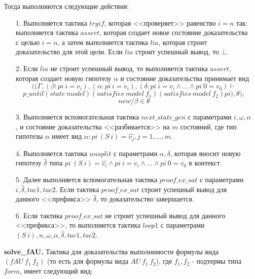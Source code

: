 \documentclass[12pt]{article}
\begin{document}
Тогда выполняются следующие действия:
\begin{enumerate}
    \item[1.] Выполняется тактика $tryif$, которая <<проверяет>> равенство $i=n$ так: выполняется тактика $assert$, которая создает новое состояние доказательства с целью $i=n$, а затем выполняется тактика $lia$, которая строит доказательство для этой цели. Если $lia$ строит успешный вывод, то $\bot$.
    \item[2.] Если $lia$ не строит успешный вывод, то выполняется тактика $assert$, которая создает новую гипотезу $\alpha$ и состояние доказательства принимает вид
    $$((\Gamma, (\beta: pi\ i = v_i),(\alpha: pi\ i = v_i),(\delta: pi\ i = v_{i} \wedge ... \wedge pi\ 0 = v_0) \vdash $$
    $$p\_until (state\ model) (satisfies\ model\ f_1) (satisfies\ model\ f_2) pi), \theta),$$
    $$new/\beta \in \theta$$
    \item[3.] Выполняется вспомогательная тактика $next\_state\_gen$ с параметрами $i, \omega, \alpha$, и состояние доказательства <<разбивается>> на $m$ состояний, где тип гипотезы $\alpha$ имеет вид $\alpha:pi\ (S\ i) = \hat{v_j}, j=1,...,m.$
    \item[4.] Выполняется тактика $unsplit$ с параметрами $\alpha, \delta$, которая вносит новую гипотезу $\hat{\delta}$ типа $pi\ (S\ i) = \hat{v_i} \wedge pi\ i = v_{i} \wedge ... \wedge pi\ 0 = v_0$ в контекст.
    \item[5.] Далее выполняется вспомогательная тактика $proof\_ex\_sat$ с параметрами $i, \hat{\delta}, tac1, tac2$. Если тактика $proof\_ex\_sat$ строит успешный вывод для данного <<префикса>> $\hat{\delta}$, то доказательство завершается.
    \item[6.] Если тактика $proof\_ex\_sat$ не строит успешный вывод для данного <<префикса>>, то выполняется тактика $loop1$ с параметрами $(S\ i), n, \omega, \alpha, \hat{\delta}, tac1, tac2$.
\end{enumerate}


\textbf{solve\_fAU.}
Тактика для доказательства выполнимости формулы вида $(fAU\ f_1\ f_2)$ (то есть для формулы вида $AU\ f_1\ f_2$), где $f_1,f_2$ - подтермы типа $form$, имеет следующий вид:
\end{document}
